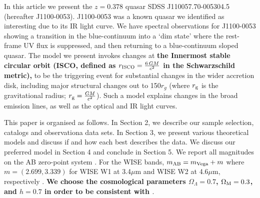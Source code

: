 \documentclass[a4paper,fleqn,usenatbib]{mnras}
\begin{document}
In this article we present the $z=0.378$ quasar SDSS J110057.70-005304.5 (hereafter J1100-0053).  J1100-0053 was a known quasar we identified as interesting due to its IR light curve. We have spectral observations for J1100-0053 showing a transition in the blue-continuum into a `dim state' where the rest-frame UV flux is suppressed, and then returning to a blue-continuum sloped quasar.  The model we present invokes changes at {\bf the Innermost stable circular orbit (ISCO, defined as $r_{\textsc{ISCO}}={\frac {6\,GM}{c^{2}}}$ in the Schwarzschild metric),} to be the triggering event for substantial changes in the wider accretion disk, including major structural changes out to 150$r_{g}$ (where $r_{\rm g}$ is the gravitational radius; $r_{\rm g}=\frac{GM}{c^2}$). Such a model explains changes in the broad emission lines, as well as the optical and IR light curves.

This paper is organised as follows.  In Section 2, we describe our sample selection, catalogs and observationa data sets.  In Section 3, we present various theoretical models and discuss if and how each best describes the data.  We discuss our preferred model in Section 4 and conclude in Section 5.  We report all magnitudes on the AB zero-point system \citep{Oke_Gunn1983, Fukugita1996}.  For the WISE bands, $m_{\rm AB} = m_{\rm Vega} + m$ where $m = (2.699, 3.339)$ for WISE W1 at 3.4$\mu$m and WISE W2 at 4.6$\mu$m, respectively \citep{Cutri2011}. {\bf We choose the cosmological  parameters $\Omega_{\Lambda} = 0.7$, $\Omega_{\rm M}  = 0.3$, and $h = 0.7$ in order to be consistent with \citet{Shen2011}}. 
\end{document}
